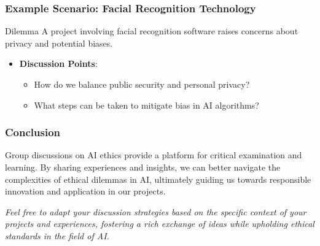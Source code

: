 \documentclass[aspectratio=169]{beamer}
\begin{document}
\begin{frame}[fragile]
    \frametitle{Example Scenario: Facial Recognition Technology}
    \begin{block}{Dilemma}
        A project involving facial recognition software raises concerns about privacy and potential biases.
    \end{block}
    \begin{itemize}
        \item \textbf{Discussion Points}:
        \begin{itemize}
            \item How do we balance public security and personal privacy?
            \item What steps can be taken to mitigate bias in AI algorithms?
        \end{itemize}
    \end{itemize}
\end{frame}

\begin{frame}[fragile]
    \frametitle{Conclusion}
    Group discussions on AI ethics provide a platform for critical examination and learning. By sharing experiences and insights, we can better navigate the complexities of ethical dilemmas in AI, ultimately guiding us towards responsible innovation and application in our projects.

    \smallskip
    \textit{Feel free to adapt your discussion strategies based on the specific context of your projects and experiences, fostering a rich exchange of ideas while upholding ethical standards in the field of AI.}
\end{frame}
\end{document}
